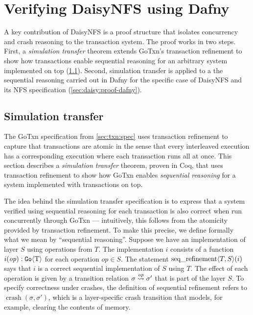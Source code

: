 \section{Verifying DaisyNFS using Dafny}
\label{sec:daisy:proof}

A key contribution of DaisyNFS is a proof structure that isolates concurrency and crash
reasoning to the transaction system. The proof works in two steps. First, a
\emph{simulation transfer} theorem extends GoTxn's transaction refinement to show
how transactions enable sequential reasoning for an arbitrary system implemented on
top (\cref{sec:daisy:simulation-transfer}). Second, simulation transfer is
applied to a the sequential reasoning carried out in Dafny for the specific case
of DaisyNFS and its NFS specification (\cref{sec:daisy:proof-dafny}).

\subsection{Simulation transfer}%
\label{sec:daisy:simulation-transfer}

The GoTxn specification from \cref{sec:txn:spec} uses transaction refinement to
capture that transactions are atomic in the sense that every interleaved
execution has a corresponding execution where each transaction runs all at once.
This section describes a \emph{simulation transfer} theorem, proven in Coq, that
uses transaction refinement to show how GoTxn enables \emph{sequential
reasoning} for a system implemented with transactions on top.

The idea behind the simulation transfer specification is to express that a system
verified using sequential reasoning for each transaction is also correct when
run concurrently through GoTxn --- intuitively, this follows from the atomicity
provided by transaction refinement.
To make this precise, we define formally what we mean by
``sequential reasoning''. Suppose we have an
implementation of layer $S$ using operations from $T$. The implementation $i$
consists of a function $i(\mathit{op}) : \mathtt{Go}\langle \mathrm{T} \rangle$ for each operation $op \in S$. The statement
$\operatorname{seq\_refinement} \langle T, S \rangle(i)$ says that $i$ is a correct sequential
implementation of $S$ using $T$. The effect of each operation is given by a
transition relation $\sigma \overset{\mathit{op}}{\leadsto} \sigma'$ that is part of the layer
$S$. To specify correctness under crashes, the
definition of sequential refinement refers to $\operatorname{crash}(\sigma, \sigma')$, which is a
layer-specific crash transition that models, for example, clearing the
contents of memory.

